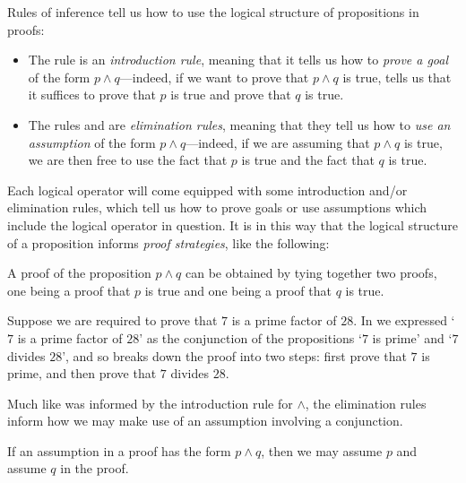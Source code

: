 Rules of inference tell us how to use the logical structure of propositions in proofs:

\begin{itemize}
\item The rule \introrule{\wedge} is an \textit{introduction rule}, meaning that it tells us how to \textit{prove a goal} of the form $p \wedge q$---indeed, if we want to prove that $p \wedge q$ is true, \introrule{\wedge} tells us that it suffices to prove that $p$ is true and prove that $q$ is true.

\item The rules  and  are \textit{elimination rules}, meaning that they tell us how to \textit{use an assumption} of the form $p \wedge q$---indeed, if we are assuming that $p \wedge q$ is true, we are then free to use the fact that $p$ is true and the fact that $q$ is true.
\end{itemize}

Each logical operator will come equipped with some introduction and/or elimination rules, which tell us how to prove goals or use assumptions which include the logical operator in question. It is in this way that the logical structure of a proposition informs \textit{proof strategies}, like the following:

\begin{strategy}
\label{strProvingConjunctionsDirect}
A proof of the proposition $p \wedge q$ can be obtained by tying together two proofs, one being a proof that $p$ is true and one being a proof that $q$ is true.
\end{strategy}

\begin{example}
\label{exSevenDividesTwentyEightConjunctionProof}
Suppose we are required to prove that $7$ is a prime factor of $28$. In  we expressed `$7$ is a prime factor of $28$' as the conjunction of the propositions `$7$ is prime' and `$7$ divides $28$', and so  breaks down the proof into two steps: first prove that $7$ is prime, and then prove that $7$ divides $28$.
\end{example}

Much like  was informed by the introduction rule for $\wedge$, the elimination rules inform how we may make use of an assumption involving a conjunction.

\begin{strategy}
\label{strAssumingConjunctionsDirect}
If an assumption in a proof has the form $p \wedge q$, then we may assume $p$ and assume $q$ in the proof.
\end{strategy}

